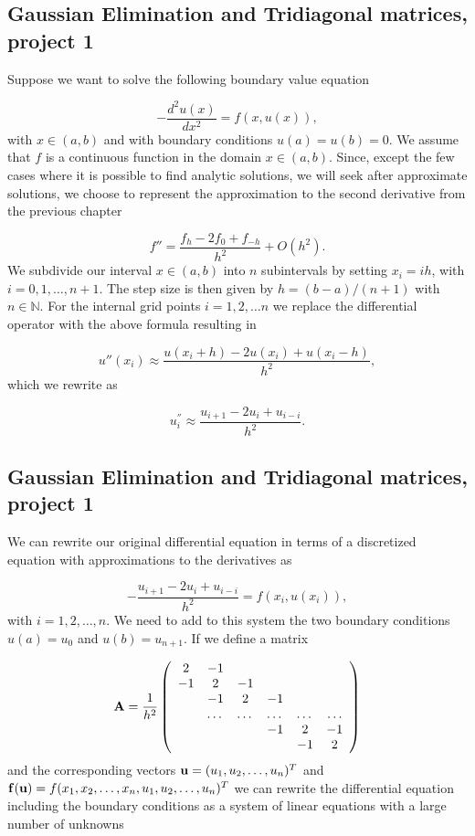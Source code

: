 \documentclass[%
twoside,                 %
final,                   %
10pt]{article}
\begin{document}
{{%
\subsection{Gaussian Elimination and Tridiagonal matrices, project 1}

Suppose we want to solve the following boundary value equation

\[
  -\frac{d^2u(x)}{dx^2} = f(x,u(x)),
\]
with $x\in (a,b)$ and with boundary conditions $u(a)=u(b) = 0$.
We assume that $f$ is a continuous function in the domain $x\in (a,b)$.
Since, except the few cases where it is possible to find analytic solutions, we
will seek after approximate solutions, we choose to represent the approximation to the second derivative
from the previous chapter

\[
  f''=\frac{f_h -2f_0 +f_{-h}}{h^2} +O(h^2).
\]
We subdivide our interval $x\in (a,b)$ into $n$ subintervals by setting $x_i = ih$, with $i=0,1,\dots,n+1$.
The step size is then given by $h=(b-a)/(n+1)$ with $n\in {\mathbb{N}}$.
For the internal grid points $i=1,2,\dots n$ we replace the differential operator with the above formula
resulting in

\[
u''(x_i) \approx  \frac{u(x_i+h) -2u(x_i) +u(x_i-h)}{h^2},
\]
which we rewrite as

\[
u^{''}_i \approx  \frac{u_{i+1} -2u_i +u_{i-i}}{h^2}.
\]

\subsection{Gaussian Elimination and Tridiagonal matrices, project 1}

We can rewrite our original differential equation in terms of a discretized equation with approximations to the
derivatives as

\[
    -\frac{u_{i+1} -2u_i +u_{i-i}}{h^2}=f(x_i,u(x_i)),
\]
with $i=1,2,\dots, n$. We need to add to this system the two boundary conditions $u(a) =u_0$ and $u(b) = u_{n+1}$.
If we define a matrix

\[
    {\bf A} = \frac{1}{h^2}\left(\begin{array}{cccccc}
                          2 & -1 &  &   &  & \\
                          -1 & 2 & -1 & & & \\
                           & -1 & 2 & -1 & &  \\
                           & \dots   & \dots &\dots   &\dots & \dots \\
                           &   &  &-1  &2& -1 \\
                           &    &  &   &-1 & 2 \\
                      \end{array} \right)
\]
and the corresponding vectors ${\bf u} = (u_1, u_2, \dots,u_n)^T$ and
${\bf f}({\bf u}) = f(x_1,x_2,\dots, x_n,u_1, u_2, \dots,u_n)^T$  we can rewrite the differential equation
including the boundary conditions as a system of linear equations with  a large number of unknowns

}}
\end{document}
